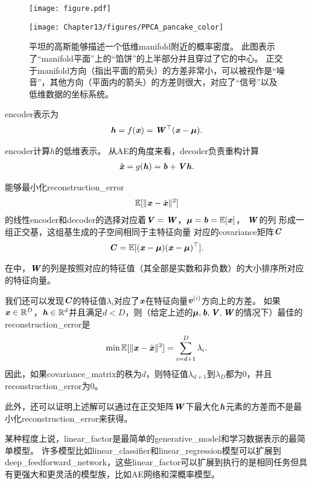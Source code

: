 \begin{figure}[!htb]
\ifOpenSource
\centerline{\texttt{[image: figure.pdf]}}
\else
	\centerline{\texttt{[image: Chapter13/figures/PPCA\_pancake\_color]}}
\fi
\caption{平坦的高斯能够描述一个低维\gls{manifold}附近的概率密度。
此图表示了``\gls{manifold}平面''上的``馅饼''的上半部分并且穿过了它的中心。
正交于\gls{manifold}方向（指出平面的箭头）的方差非常小，可以被视作是``噪音''，其他方向（平面内的箭头）的方差则很大，对应了``信号''以及低维数据的坐标系统。}
\label{fig:PPCA_pancake}
\end{figure}


\gls{encoder}表示为
\begin{align}
\label{eqn:1319}
\boldsymbol{\mathit{h}}  = f(\boldsymbol{\mathit{x}}) = \boldsymbol{\mathit{W}}^{\top} (\boldsymbol{\mathit{x}} - \boldsymbol{\mu}).
\end{align}


\gls{encoder}计算$h$的低维表示。
从\gls{AE}的角度来看，\gls{decoder}负责重构计算
\begin{align}
\label{eqn:1320}
\hat{\boldsymbol{\mathit{x}}} = g(\boldsymbol{\mathit{h}}) = \boldsymbol{\mathit{b}} + \boldsymbol{\mathit{V}} \boldsymbol{\mathit{h}}.
\end{align}


能够最小化\gls{reconstruction_error}
\begin{align}
\label{eqn:1321}
\mathbb{E}[\Vert\boldsymbol{\mathit{x}} - \hat{\boldsymbol{\mathit{x}}}\Vert^2]
\end{align}
的线性\gls{encoder}和\gls{decoder}的选择对应着$\boldsymbol{\mathit{V}} = \boldsymbol{\mathit{W}}$，${\boldsymbol{\mu}} = \boldsymbol{\mathit{b}} = \mathbb{E}[\boldsymbol{\mathit{x}}]$， $\boldsymbol{\mathit{W}}$的列 形成一组正交基，这组基生成的子空间相同于主特征向量 对应的\gls{covariance}矩阵$\boldsymbol{\mathit{C}}$
\begin{align}
\label{eqn:1322}
\boldsymbol{\mathit{C}} = \mathbb{E}[(\boldsymbol{\mathit{x}} - {\boldsymbol{\mu}})(\boldsymbol{\mathit{x}} - {\boldsymbol{\mu}})^{\top}].
\end{align}



在中，$\boldsymbol{\mathit{W}}$的列是按照对应的特征值（其全部是实数和非负数）的大小排序所对应的特征向量。

我们还可以发现$\boldsymbol{\mathit{C}}$的特征值$\lambda_i$对应了$\boldsymbol{\mathit{x}}$在特征向量$\boldsymbol{\mathit{v}}^{(i)}$方向上的方差。
如果$\boldsymbol{\mathit{x}}\in \mathbb{R}^D$，$\boldsymbol{\mathit{h}}\in\mathbb{R}^d$并且满足$d<D$，则（给定上述的${\boldsymbol{\mu}},\boldsymbol{\mathit{b}},\boldsymbol{\mathit{V}},\boldsymbol{\mathit{W}}$的情况下）最佳的\gls{reconstruction_error}是
\begin{align}
\label{eqn:1323}
\min \mathbb{E}[\Vert \boldsymbol{\mathit{x}} - \hat{\boldsymbol{\mathit{x}}} \Vert^2] = \sum_{i=d+1}^{D}\lambda_i.
\end{align}
因此，如果\gls{covariance_matrix}的秩为$d$，则特征值$\lambda_{d+1}$到$\lambda_{D}$都为$0$，并且\gls{reconstruction_error}为$0$。

此外，还可以证明上述解可以通过在正交矩阵$\boldsymbol{\mathit{W}}$下最大化$\boldsymbol{\mathit{h}}$元素的方差而不是最小化\gls{reconstruction_error}来获得。


某种程度上说，\gls{linear_factor}是最简单的\gls{generative_model}和学习数据表示的最简单模型。
许多模型比如\gls{linear_classifier}和\gls{linear_regression}模型可以扩展到\gls{deep_feedforward_network}，这些\gls{linear_factor}可以扩展到执行的是相同任务但具有更强大和更灵活的模型族，比如\gls{AE}网络和深概率模型。














